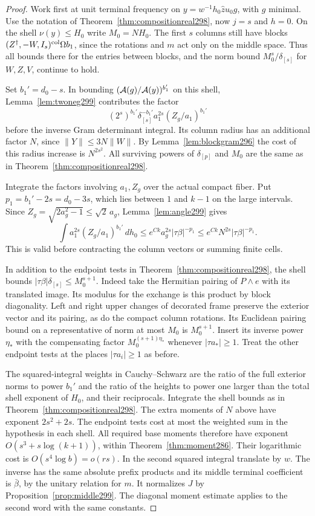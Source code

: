 \documentclass[a4paper,11pt]{article}
\theoremstyle{definition}
\theoremstyle{remark}
\numberwithin{equation}{section}
\begin{document}
\begin{proof}
Work first at unit terminal frequency on
\(y=w^{-1}h_0\widehat z u_0g\), with \(g\) minimal.
Use the notation of Theorem~\ref{thm:compositionreal298},
now \(j=s\) and \(h=0\). On the shell \(\nu(y)\le H_0\)
write \(M_0=NH_0\). The first \(s\) columns still have
blocks \((Z^\dagger,-W,I_s)^{\rm col}\Omega b_1\), since
the rotations and \(m\) act only on the middle space.
Thus all bounds there for the entries between blocks, and
the norm bound \(M_0^s/\delta_{[s]}\) for \(W,Z,V\),
continue to hold.

Set \(b_1'=d_0-s\). In bounding
\(({\cal A}(g)/{\cal A}(y))^{b_1'}\) on this shell,
Lemma~\ref{lem:twoneg299} contributes the factor
\[
       (2^s)^{b_1'}\delta_{[s]}^{-b_1'}
                        a_1^{2s}(Z_g/a_1)^{b_1'}
\]
before the inverse Gram determinant integral. Its column
radius has an additional factor \(N\), since
\(\|Y\|\le 3N\|W\|\). By Lemma~\ref{lem:blockgram296}
the cost of this radius increase is \(N^{2s^2}\).
All surviving powers of \(\delta_{[p]}\) and \(M_0\)
are the same as in Theorem~\ref{thm:compositionreal298}.

Integrate the factors involving \(a_1,Z_g\) over the actual
compact fiber.
Put \(p_1=b_1'-2s=d_0-3s\), which lies between \(1\)
and \(k-1\) on the large intervals. Since
\(Z_g=\sqrt{2a_g^2-1}\le\sqrt{2}\,a_g\), Lemma~\ref{lem:angle299}
gives
\[
  \int a_1^{2s}(Z_g/a_1)^{b_1'}\,dh_0
       \le e^{Ck}a_g^{2s}|\tau\beta|^{-p_1}
       \le e^{Ck}N^{2s}|\tau\beta|^{-p_1}.
\]
This is valid before contracting the column vectors or
summing finite cells.

In addition to the endpoint tests in
Theorem~\ref{thm:compositionreal298}, the shell bounds
\(|\tau\beta|\delta_{[s]}\le M_0^{s+1}\). Indeed take
the Hermitian pairing of \(P\wedge e\) with its translated
image. Its modulus for the exchange is this product by
block diagonality. Left and right upper changes of
decorated frame preserve the exterior vector and its
pairing, as do the compact column rotations. Its Euclidean
pairing bound on a representative of norm at most \(M_0\)
is \(M_0^{s+1}\). Insert its inverse power \(\eta_*\)
with the compensating factor \(M_0^{(s+1)\eta_*}\)
whenever \(|\tau a_*|\ge1\). Treat the other endpoint
tests at the places \(|\tau a_i|\ge1\) as before.

The squared-integral weights in Cauchy--Schwarz are the
ratio of the full exterior norms to power \(b_1'\) and the
ratio of the heights to power one larger than the total
shell exponent of \(H_0\), and their reciprocals.
Integrate the shell bounds as in
Theorem~\ref{thm:compositionreal298}. The extra moments
of \(N\) above have exponent \(2s^2+2s\). The endpoint
tests cost at most the weighted sum in the hypothesis
in each shell. All required base moments therefore have
exponent \(O(s^3+s\log(k+1))\), within
Theorem~\ref{thm:moment286}. Their logarithmic cost is
\(O(s^4\log b)=o(rs)\). In the second squared integral
translate by \(w\). The inverse has the same absolute
prefix products and its middle terminal coefficient is
\(\bar\beta\), by the unitary relation for \(m\).
It normalizes \(J\) by Proposition~\ref{prop:middle299}.
The diagonal moment estimate applies to the second word
with the same constants.


\end{proof}
\end{document}
